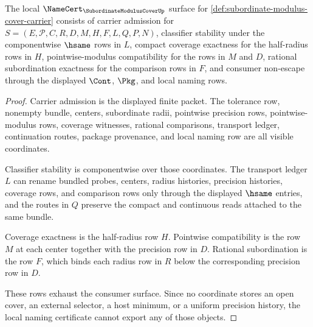 \begin{theorem}
\label{thm:subordinate-modulus-cover-namecert-obligations}
The local $\NameCert_{\SubordinateModulusCoverUp}$ surface for \autoref{def:subordinate-modulus-cover-carrier} consists of carrier admission for $S=(E,\mathcal{P},C,R,D,M,H,F,L,Q,P,N)$, classifier stability under the componentwise $\hsame$ rows in $L$, compact coverage exactness for the half-radius rows in $H$, pointwise-modulus compatibility for the rows in $M$ and $D$, rational subordination exactness for the comparison rows in $F$, and consumer non-escape through the displayed $\Cont$, $\Pkg$, and local naming rows.
\end{theorem}
\begin{proof}
Carrier admission is the displayed finite packet. The tolerance row, nonempty bundle, centers, subordinate radii, pointwise precision rows, pointwise-modulus rows, coverage witnesses, rational comparisons, transport ledger, continuation routes, package provenance, and local naming row are all visible coordinates.

Classifier stability is componentwise over those coordinates. The transport ledger $L$ can rename bundled probes, centers, radius histories, precision histories, coverage rows, and comparison rows only through the displayed $\hsame$ entries, and the routes in $Q$ preserve the compact and continuous reads attached to the same bundle.

Coverage exactness is the half-radius row $H$. Pointwise compatibility is the row $M$ at each center together with the precision row in $D$. Rational subordination is the row $F$, which binds each radius row in $R$ below the corresponding precision row in $D$.

These rows exhaust the consumer surface. Since no coordinate stores an open cover, an external selector, a host minimum, or a uniform precision history, the local naming certificate cannot export any of those objects.
\end{proof}

